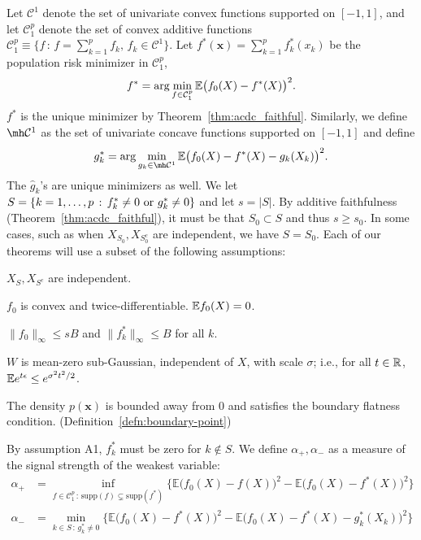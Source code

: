 Let $\mathcal{C}^1$ denote the set of univariate convex functions
supported on $[-1,1]$, 
and let  $\mathcal{C}_1^{p}$ denote the set of convex additive functions
$\mathcal{C}_1^p \equiv \{ f \,:\, f = \sum_{k=1}^p f_k, \,
   f_k \in \mathcal{C}^1 \} $.  
Let $f^*(\mathbf{x}) = \sum_{k=1}^p f^*_k(x_k)$ be the population risk
minimizer in $\mathcal{C}_1^p$, 
\begin{equation}
f^* = \arg\min_{f \in \mathcal{C}_1^p} {\mathbb E}\big(f_0(X) - f^*(X)
\big)^2.
\end{equation}
$f^*$ is the unique minimizer by Theorem~\ref{thm:acdc_faithful}. Similarly, we define $\mh \mathcal{C}^1$ as the set of univariate concave functions supported on $[-1, 1]$ and define
\begin{equation}
g^*_k = \arg\min_{g_k \in \mh \mathcal{C}^1} \E \big( f_0(X) - f^*(X)
- g_k(X_k) \big)^2.
\end{equation}
The $\hat{g}_k$'s are unique minimizers as well. We let $S = \{ k = 1,\ldots,p \,:\, f^*_k \neq 0 \textrm{ or } g^*_k \neq 0\}$ and let $s = |S|$. By additive faithfulness (Theorem~\ref{thm:acdc_faithful}), it must be that $S_0 \subset S$ and thus $s \geq s_0$. In some cases, such as when $X_{S_0}, X_{S^c_0}$ are independent, we have $S = S_0$.
Each of our theorems will use a subset of the following assumptions:
\begin{packed_enum}
\item[A1:] $X_S, X_{S^c}$ are independent. 
\item[A2:] $f_0$ is convex and twice-differentiable. ${\mathbb E} f_0(X) = 0$.
\item[A3:] $\|f_0\|_\infty \leq sB$ and $\| f^*_k \|_\infty \leq B$ for all $k$.
\item[A4:] $W$ is mean-zero sub-Gaussian, independent of $X$, with scale $\sigma$; i.e., for all $t \in {\mathbb R}$, ${\mathbb E} e^{t \epsilon} \leq e^{\sigma^2 t^2 / 2}$.
\item[A5:] The density $p(\mathbf{x})$ is bounded away from 0 and satisfies the boundary flatness condition. (Definition~\ref{defn:boundary-point})
\end{packed_enum}
By assumption A1, $f^*_k$ must be zero for $k\notin S$.
We define $\alpha_{+}, \alpha_{-}$ as a measure of the signal strength of the weakest variable:
\begin{align}
\alpha_{+} &= \inf_{f \in \mathcal{C}_1^p \,:\, \textrm{supp}(f) \subsetneq \textrm{supp}(f^*)} 
       \Big\{ \mathbb{E} \big( f_0(X) - f(X) \big)^2 - 
        \mathbb{E} \big( f_0(X) - f^*(X) \big)^2  \Big\} \label{eqn:signal_level_defn} \\
\alpha_{-} &=   \min_{k \in S \,:\, g^*_k \neq 0}
      \Big\{ \mathbb{E} \big( f_0(X) - f^*(X) \big)^2 - 
    \mathbb{E} \big( f_0(X) - f^*(X) - g^*_k(X_k) \big)^2 \Big\} \nonumber
\end{align}

